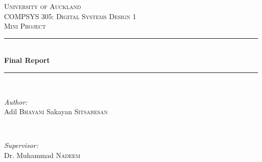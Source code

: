 \begin{titlepage}

\newcommand{\HRule}{\rule{\linewidth}{0.5mm}} %

\center %
 

\textsc{\LARGE University of Auckland}\\[1.5cm] %
\textsc{\Large COMPSYS 305: Digital Systems Design 1}\\[0.5cm] %
\textsc{\large Mini Project }\\[0.5cm] %


\HRule \\[0.4cm]
{ \huge \bfseries Final Report}\\[0.4cm] %
\HRule \\[1.5cm]
 

\begin{minipage}{0.4\textwidth}
\begin{flushleft} \large
\emph{Author:}\\
Adil \textsc{Bhayani} \newline
Sakayan \textsc{Sitsabesan}
\end{flushleft}
\end{minipage}
~
\begin{minipage}{0.4\textwidth}
\begin{flushright} \large
\emph{Supervisor:} \\
Dr. Muhammad \textsc{Nadeem} %
\end{flushright}
\end{minipage}\\[1cm]




\end{titlepage}
